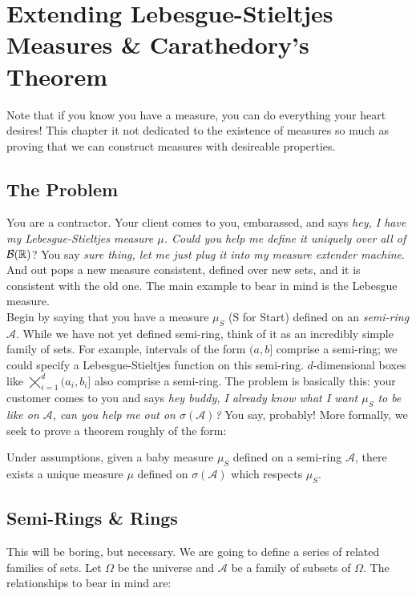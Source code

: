 
\chapter{Extending Lebesgue-Stieltjes Measures \& Carathedory's Theorem}

Note that if you know you have a measure, you can do everything your heart desires! 
This chapter it not dedicated to the existence of measures so much as proving that
we can construct measures with desireable properties.

\section{The Problem}

You are a contractor. Your client comes to you, embarassed, and says \emph{hey, I have my 
Lebesgue-Stieltjes measure $\mu$. Could you help me define it uniquely 
 over all of $\mathcal B(\mathbb R)$}? You say \emph{sure thing, let me just plug it into my 
 measure extender machine}. And out pops a new measure consistent, defined over 
 new sets, and it is consistent with the old one. The main example to bear in mind is 
 the Lebesgue measure. \\ 

 Begin by saying that you have a measure $\mu_S$ (S for Start) defined on an \emph{semi-ring} $\mathcal A$. While 
 we have not yet defined semi-ring, think of it as an incredibly simple family of sets. For example, intervals of the form 
 $(a,b]$ comprise a semi-ring; we could specify a Lebesgue-Stieltjes function on this semi-ring.
 $d$-dimensional boxes like $\bigtimes_{i=1}^d (a_i,b_i]$ also comprise a semi-ring. The problem is basically this: 
 your customer comes to you and says \emph{hey buddy, I already know what I want $\mu_S$ to be like on 
 $\mathcal A$, can you help me out on $\sigma(\mathcal A)$?} You say, probably! More formally, we 
 seek to prove a theorem roughly of the form: 

 \begin{theorem}
   Under assumptions, given a baby measure $\mu_S$ defined on a semi-ring 
   $\mathcal A$, there exists a unique measure $\mu$ defined on $\sigma(\mathcal A)$ 
   which respects $\mu_S$.
 \end{theorem}

 \section{Semi-Rings \& Rings}

 This will be boring, but necessary. We are going to define a series 
 of related families of sets. Let $\Omega$ be the universe and 
 $\mathcal A$ be a family of subsets of $\Omega$. The relationships 
 to bear in mind are: 

